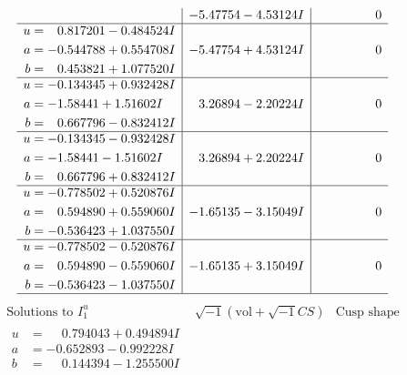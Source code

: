 \documentclass[1p]{elsarticle_modified}
\theoremstyle{definition}
\newcommand{\I}{\sqrt{-1}}
\begin{document}
$$\begin{array}{c|c|c}
 & -5.47754 - 4.53124 I & \phantom{-0.000000 } 0 \\ \hline\begin{aligned}
u &= \phantom{-}0.817201 - 0.484524 I \\
a &= -0.544788 + 0.554708 I \\
b &= \phantom{-}0.453821 + 1.077520 I\end{aligned}
 & -5.47754 + 4.53124 I & \phantom{-0.000000 } 0 \\ \hline\begin{aligned}
u &= -0.134345 + 0.932428 I \\
a &= -1.58441 + 1.51602 I \\
b &= \phantom{-}0.667796 - 0.832412 I\end{aligned}
 & \phantom{-}3.26894 - 2.20224 I & \phantom{-0.000000 } 0 \\ \hline\begin{aligned}
u &= -0.134345 - 0.932428 I \\
a &= -1.58441 - 1.51602 I \\
b &= \phantom{-}0.667796 + 0.832412 I\end{aligned}
 & \phantom{-}3.26894 + 2.20224 I & \phantom{-0.000000 } 0 \\ \hline\begin{aligned}
u &= -0.778502 + 0.520876 I \\
a &= \phantom{-}0.594890 + 0.559060 I \\
b &= -0.536423 + 1.037550 I\end{aligned}
 & -1.65135 - 3.15049 I & \phantom{-0.000000 } 0 \\ \hline\begin{aligned}
u &= -0.778502 - 0.520876 I \\
a &= \phantom{-}0.594890 - 0.559060 I \\
b &= -0.536423 - 1.037550 I\end{aligned}
 & -1.65135 + 3.15049 I & \phantom{-0.000000 } 0\\
 \hline 
 \end{array}$$\newpage$$\begin{array}{c|c|c}  
\text{Solutions to }I^u_{1}& \I (\text{vol} + \sqrt{-1}CS) & \text{Cusp shape}\\
 \hline 
\begin{aligned}
u &= \phantom{-}0.794043 + 0.494894 I \\
a &= -0.652893 - 0.992228 I \\
b &= \phantom{-}0.144394 - 1.255500 I\end{aligned}

\end{array}$$
\end{document}
